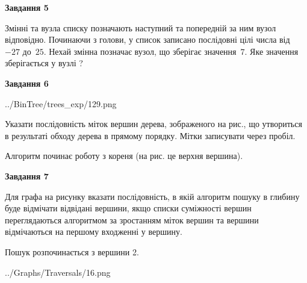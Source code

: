 \documentclass[12pt, ukrainian]{article}
\begin{document}
{\begin {large}
{\begin {center}\textbf{Завдання 5}\end {center}}\par
Змінні  та  вузла списку позначають наступний та попередній за ним вузол відповідно. Починаючи з голови, у список записано послідовні цілі числа від~$-27$ до~$25$. Нехай змінна  позначає вузол, що зберігає значення~$7$.
Яке значення зберігається у вузлі  ?\par
\newpage

{\begin {center}\textbf{Завдання 6}\end {center}}\par

\begin{center}
	{../BinTree/trees_exp/129.png}
\end{center}
Указати послідовність міток вершин дерева, зображеного на рис., що утвориться в результаті обходу дерева в прямому порядку. Мітки записувати через пробіл.\par Алгоритм починає роботу з кореня (на рис. це верхня вершина).\par
\newpage

{\begin {center}\textbf{Завдання 7}\end {center}}\par
Для графа на рисунку вказати послідовність, в якій алгоритм пошуку в глибину буде відмічати відвідані вершини, якщо списки суміжності вершин переглядаються алгоритмом за зростанням міток вершин та вершини відмічаються на першому вход\-женні у вершину.\par
Пошук розпочинається з вершини 2.\par

\begin{center}
	{../Graphs/Traversals/16.png}
\end{center}\par
\newpage


\end{large}}
\end{document}
